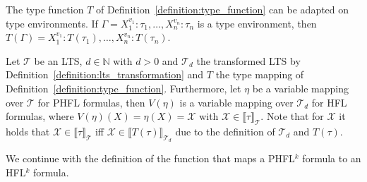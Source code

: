 The type function $T$ of Definition~\ref{definition:type_function} can be adapted on type environments. If
$\Gamma = X_1^{v_1} \colon \tau_1, \dots, X_n^{v_n} \colon \tau_n$ is a type environment, then $T(\Gamma) =
X_1^{v_1} \colon T(\tau_1), \dots, X_n^{v_n} \colon T(\tau_n)$.

\begin{definition}
    \label{definition:variable_mapping_function}
    Let $\mathcal{T}$ be an LTS, $d \in \mathbb{N}$ with $d >0$ and $\mathcal{T}_d$ the transformed LTS by
    Definition~\ref{definition:lts_transformation} and $T$ the type mapping of
    Definition~\ref{definition:type_function}. Furthermore, let $\eta$ be a variable mapping over $\mathcal{T}$ for PHFL
    formulas, then $V(\eta)$ is a variable mapping over $\mathcal{T}_d$ for HFL formulas, where $V(\eta)(X) = \eta(X) = \mathcal{X}$ with $\mathcal{X} \in \llbracket \tau \rrbracket_\mathcal{T}$. Note that for $\mathcal{X}$ it holds that $\mathcal{X} \in \llbracket \tau
    \rrbracket_\mathcal{T}$ iff $\mathcal{X} \in \llbracket T(\tau)\rrbracket_{\mathcal{T}_d}$ due to the definition
    of $\mathcal{T}_d$ and $T(\tau)$.
\end{definition}

We continue with the definition of the function that maps a PHFL$^k$ formula to an HFL$^k$ formula.

